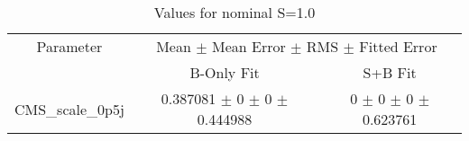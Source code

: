 \begin{table}
\centering
\caption{Values for nominal S=1.0}
\begin{tabular}{ccc}
\toprule
Parameter 	& \multicolumn{2}{c}{Mean $\pm$ Mean Error $\pm$ RMS $\pm$ Fitted Error}\\
 	& B-Only Fit & S+B Fit\\
\midrule
CMS\_scale\_0p5j 	& \num{0.387081} $\pm$ \num{0} $\pm$ \num{0} $\pm$ \num{0.444988} 	& \num{0} $\pm$ \num{0} $\pm$ \num{0} $\pm$ \num{0.623761}\\
\bottomrule
\end{tabular}
\end{table}